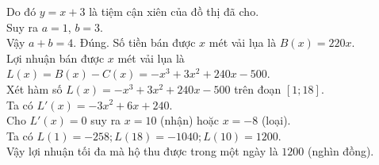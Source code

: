 \begin{ex}
{\begin{itemchoice}
			Do đó $y=x+3$ là tiệm cận xiên của đồ thị đã cho. \\
			Suy ra $a=1$, $b=3$. \\
			Vậy $a+b=4$.
			\itemch Đúng. Số tiền bán được $x$ mét vải lụa là $B(x)=220x$. \\
			Lợi nhuận bán được $x$ mét vải lụa là $L(x)= B(x)-C(x)=-x^3+3x^2+240x-500$.\\
			Xét hàm số $L(x)=-x^3+3x^2+240x-500$ trên đoạn $[1;18]$.\\ 
			Ta có  $L'(x)=-3x^2+6x+240$. \\
			Cho $L'(x)=0$ suy ra $x=10$ (nhận) hoặc $x=-8$ (loại).\\
			Ta có $L(1)=-258; L(18)=-1040;L(10)=1200$. \\
			Vậy lợi nhuận tối đa mà hộ thu được trong một ngày là $1200$ (nghìn đồng).
		\end{itemchoice}
	}
\end{ex}


